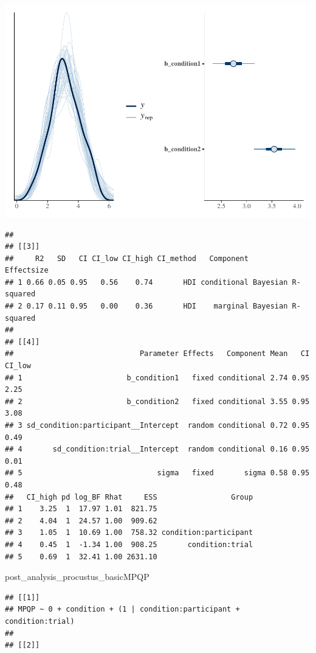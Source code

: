 \documentclass[
]{article}
\newenvironment{Shaded}{\begin{snugshade}}{\end{snugshade}}
\newcommand{\NormalTok}[1]{#1}
\begin{document}
\includegraphics{08_Publish_GUSO_ASIL_files/figure-latex/DiagnosticsQ-2.pdf}

\begin{verbatim}
## 
## [[3]]
##     R2   SD   CI CI_low CI_high CI_method   Component         Effectsize
## 1 0.66 0.05 0.95   0.56    0.74       HDI conditional Bayesian R-squared
## 2 0.17 0.11 0.95   0.00    0.36       HDI    marginal Bayesian R-squared
## 
## [[4]]
##                             Parameter Effects   Component Mean   CI CI_low
## 1                        b_condition1   fixed conditional 2.74 0.95   2.25
## 2                        b_condition2   fixed conditional 3.55 0.95   3.08
## 3 sd_condition:participant__Intercept  random conditional 0.72 0.95   0.49
## 4       sd_condition:trial__Intercept  random conditional 0.16 0.95   0.01
## 5                               sigma   fixed       sigma 0.58 0.95   0.48
##   CI_high pd log_BF Rhat     ESS                 Group
## 1    3.25  1  17.97 1.01  821.75                      
## 2    4.04  1  24.57 1.00  909.62                      
## 3    1.05  1  10.69 1.00  758.32 condition:participant
## 4    0.45  1  -1.34 1.00  908.25       condition:trial
## 5    0.69  1  32.41 1.00 2631.10
\end{verbatim}

\begin{Shaded}
\begin{Highlighting}[]
\NormalTok{post\_analysis\_procustus\_basicMPQP}
\end{Highlighting}
\end{Shaded}

\begin{verbatim}
## [[1]]
## MPQP ~ 0 + condition + (1 | condition:participant + condition:trial) 
## 
## [[2]]
\end{verbatim}
\end{document}
